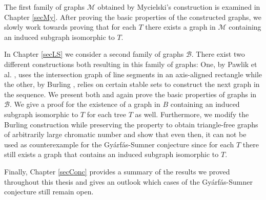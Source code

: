 The first family of graphs $\mathcal{M}$ obtained by Mycielski's construction \cite{My55} is examined in Chapter \ref{secMy}. After proving the basic properties of the constructed graphs, we slowly work towards proving that for each $T$ there exists a graph in $\mathcal{M}$ containing an induced subgraph isomorphic to $T$.

In Chapter \ref{secLS} we consider a second family of graphs $\mathcal{B}$. There exist two different constructions both resulting in this family of graphs: One, by Pawlik et al. \cite{Paw14}, uses the intersection graph of line segments in an axis-aligned rectangle while the other, by Burling \cite{Bu65}, relies on certain stable sets to construct the next graph in the sequence. We present both and again prove the basic properties of graphs in $\mathcal{B}$. We give a proof for the existence of a graph in $B$ containing an induced subgraph isomorphic to $T$ for each tree $T$ as well. Furthermore, we modify the Burling construction while preserving the property to obtain triangle-free graphs of arbitrarily large chromatic number and show that even then, it can not be used as counterexample for the Gyárfás-Sumner conjecture since for each $T$ there still exists a graph that contains an induced subgraph isomorphic to $T$.

Finally, Chapter \ref{secConc} provides a summary of the results we proved throughout this thesis and gives an outlook which cases of the Gyárfás-Sumner conjecture still remain open.